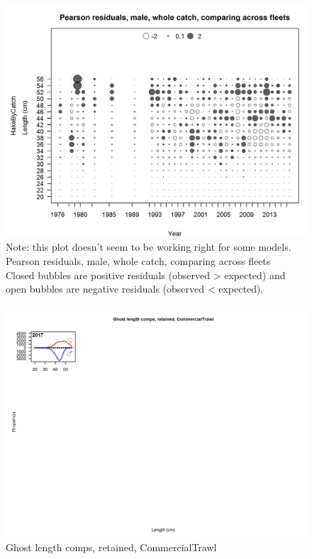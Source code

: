 \documentclass[12pt,]{article}
\begin{document}
\begin{figure}[htbp]
\centering
\includegraphics{./r4ss/plots_mod1/comp_lenfit_sex3mkt0_multi-fleet_comparison.png}
\caption{Note: this plot doesn't seem to be working right for some
models. Pearson residuals, male, whole catch, comparing across fleets\\
Closed bubbles are positive residuals (observed \textgreater{} expected)
and open bubbles are negative residuals (observed \textless{} expected).
\label{fig:mod1_38_comp_lenfit_sex3mkt0_multi-fleet_comparison}}
\end{figure}

\begin{figure}[htbp]
\centering
\includegraphics{./r4ss/plots_mod1/comp_gstlenfit_flt1mkt2.png}
\caption{Ghost length comps, retained, CommercialTrawl
\label{fig:mod1_39_comp_gstlenfit_flt1mkt2}}
\end{figure}
\end{document}
